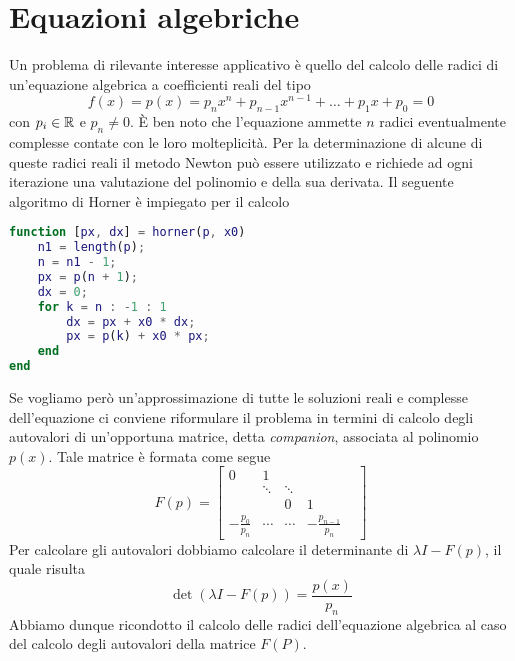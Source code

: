 \section{Equazioni algebriche}
Un problema di rilevante interesse applicativo è quello del calcolo delle radici di un'equazione algebrica
a coefficienti reali del tipo
\[ f(x) = p(x) = p_n x^n + p_{n-1} x^{n-1} + \dots + p_1 x + p_0 = 0 \]
con $p_i \in \mathbb{R}$ e $p_n \neq 0$. \`E ben noto che l'equazione ammette $n$ radici eventualmente complesse
contate con le loro molteplicità. Per la determinazione di alcune di queste radici reali il metodo Newton
può essere utilizzato e richiede ad ogni iterazione una valutazione del polinomio e della sua derivata.
Il seguente algoritmo di Horner è impiegato per il calcolo
\begin{lstlisting}[language=matlab]
function [px, dx] = horner(p, x0)
	n1 = length(p);
	n = n1 - 1;
	px = p(n + 1);
	dx = 0;
	for k = n : -1 : 1
		dx = px + x0 * dx;
		px = p(k) + x0 * px;
	end
end
\end{lstlisting}
Se vogliamo però un'approssimazione di tutte le soluzioni reali e complesse dell'equazione ci conviene
riformulare il problema in termini di calcolo degli autovalori di un'opportuna matrice, detta
\emph{companion}, associata al polinomio $p(x)$. Tale matrice è formata come segue
\[
	F(p) = \begin{bmatrix}
		0                & 1      &        &                        \\
		                 & \ddots & \ddots &                        \\
		                 &        & 0      & 1                    & \\
		-\frac{p_0}{p_n} & \cdots & \cdots & -\frac{p_{n-1}}{p_n}
	\end{bmatrix}
\]
Per calcolare gli autovalori dobbiamo calcolare il determinante di $\lambda I - F(p)$, il quale risulta
\[ \det(\lambda I - F(p)) = \frac{p(x)}{p_n} \]
Abbiamo dunque ricondotto il calcolo delle radici dell'equazione algebrica al caso del calcolo degli
autovalori della matrice $F(P)$.